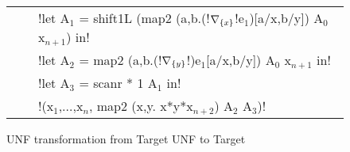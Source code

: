 \begin{figure*}[t]
\begin{tabular}{r c l}
    && !let A$_{1}$ = shift1L (map2 (a,b.(!$\nabla_{\{x\}}$!e$_{1}$)[a/x,b/y]) A$_{0}$ x$_{n+1}$) in! \\
    && !let A$_{2}$ = map2 (a,b.(!$\nabla_{\{y\}}$!)e$_{1}$[a/x,b/y]) A$_{0}$ x$_{n+1}$ in! \\
    && !let A$_{3}$ = scanr * 1 A$_{1}$ in! \\
    && !(x$_{1}$,$\ldots$,x$_n$, map2 (x,y. x*y*x$_{n+2}$) A$_{2}$ A$_{3}$)! \\
    \end{tabular}
    \caption{UNF transformation from Target UNF to Target}
    \label{fig:unf_to_target}
    \end{figure*}